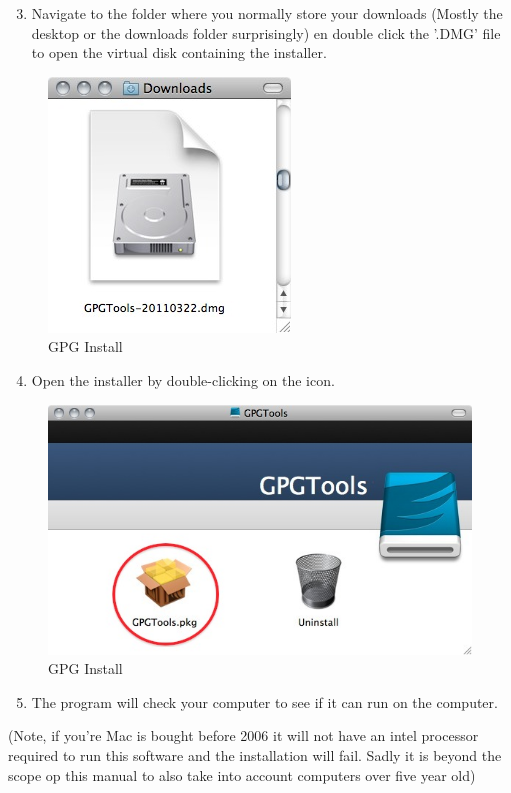 \begin{enumerate}[1.]
\setcounter{enumi}{2}
\item
  Navigate to the folder where you normally store your downloads (Mostly
  the desktop or the downloads folder surprisingly) en double click the
  '.DMG' file to open the virtual disk containing the installer.
\end{enumerate}
\begin{figure}[htbp]
\centering
\includegraphics{gpg_mac_inst_3.jpg}
\caption{GPG Install}
\end{figure}

\begin{enumerate}[1.]
\setcounter{enumi}{3}
\item
  Open the installer by double-clicking on the icon.
\end{enumerate}
\begin{figure}[htbp]
\centering
\includegraphics{gpg_mac_inst_4.jpg}
\caption{GPG Install}
\end{figure}

\begin{enumerate}[1.]
\setcounter{enumi}{4}
\item
  The program will check your computer to see if it can run on the
  computer.
\end{enumerate}
(Note, if you're Mac is bought before 2006 it will not have an intel
processor required to run this software and the installation will fail.
Sadly it is beyond the scope op this manual to also take into account
computers over five year old)


